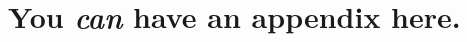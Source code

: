 \documentclass[nohyperref]{article}
\theoremstyle{plain}
\theoremstyle{definition}
\theoremstyle{remark}
\begin{document}




\nocite{langley00}





\newpage
\appendix
\onecolumn
\section{You \emph{can} have an appendix here.}
\end{document}
